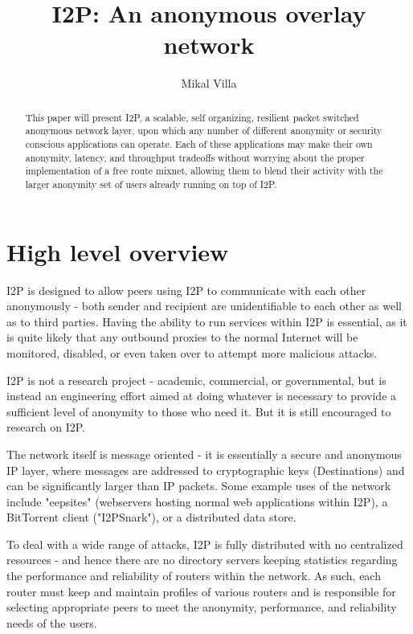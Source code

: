 \documentclass[a4paper,twocolumn,12pt]{article}
\title{I2P: An anonymous overlay network}
\author{Mikal Villa}
\begin{document}
\maketitle

\begin{abstract}\noindent
This paper will present I2P, a scalable, self organizing, resilient packet
switched anonymous network layer, upon which any number of different
anonymity or security conscious applications can operate. Each of these
applications may make their own anonymity, latency, and throughput tradeoffs
without worrying about the proper implementation of a free route mixnet,
allowing them to blend their activity with the larger anonymity set of users
already running on top of I2P.
\end{abstract}

\tableofcontents

\section{High level overview}

I2P is designed to allow peers using I2P to communicate with each other
anonymously - both sender and recipient are unidentifiable to each other as
well as to third parties. Having the ability to run services within I2P is
essential, as it is quite likely that any outbound proxies to the normal
Internet will be monitored, disabled, or even taken over to attempt more
malicious attacks.

I2P is not a research project - academic, commercial, or governmental, but is
instead an engineering effort aimed at doing whatever is necessary to provide a
sufficient level of anonymity to those who need it. But it is still encouraged
to research on I2P.

The network itself is message oriented - it is essentially a secure and
anonymous IP layer, where messages are addressed to cryptographic keys
(Destinations) and can be significantly larger than IP packets. Some example
uses of the network include "eepsites" (webservers hosting normal web
applications within I2P), a BitTorrent\cite{cohen08specification} client
("I2PSnark"), or a distributed data store.

To deal with a wide range of attacks, I2P is fully distributed with no
centralized resources - and hence there are no directory servers keeping
statistics regarding the performance and reliability of routers within the
network. As such, each router must keep and maintain profiles of various
routers and is responsible for selecting appropriate peers to meet the
anonymity, performance, and reliability needs of the users.
\end{document}
